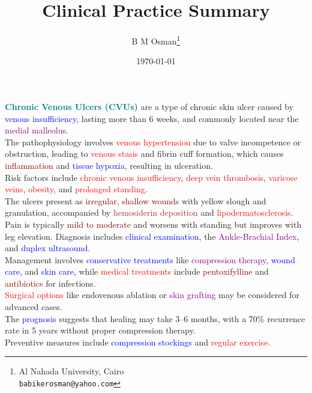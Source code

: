 \documentclass{article}
\title{Clinical Practice Summary}
\author{B M Osman\footnote{Al Nahada University, Cairo \\ \texttt{babikerosman@yahoo.com}}}
\date{\today}
\begin{document}
\maketitle

\textcolor{teal}{\Large \bf Chronic Venous Ulcers (CVUs)} are a type of chronic skin ulcer caused by \textcolor{blue}{venous insufficiency}, lasting more than 6 weeks, and commonly located near the \textcolor{purple}{medial malleolus}.\\
The pathophysiology involves \textcolor{red}{venous hypertension} due to valve incompetence or obstruction, leading to \textcolor{red}{venous stasis} and fibrin cuff formation, which causes \textcolor{darkred}{inflammation} and \textcolor{blue}{tissue hypoxia}, resulting in ulceration. \\
Risk factors include \textcolor{red}{chronic venous insufficiency}, \textcolor{red}{deep vein thrombosis}, \textcolor{red}{varicose veins}, \textcolor{red}{obesity}, and \textcolor{red}{prolonged standing}.\\
The ulcers present as \textcolor{darkred}{irregular, shallow wounds} with yellow slough and granulation, accompanied by \textcolor{brown}{hemosiderin deposition} and \textcolor{red}{lipodermatosclerosis}.\\
Pain is typically \textcolor{darkred}{mild to moderate} and worsens with standing but improves with leg elevation. Diagnosis includes \textcolor{blue}{clinical examination}, the \textcolor{purple}{Ankle-Brachial Index}, and \textcolor{blue}{duplex ultrasound}.\\
Management involves \textcolor{blue}{conservative treatments} like \textcolor{purple}{compression therapy}, \textcolor{blue}{wound care}, and \textcolor{blue}{skin care}, while \textcolor{red}{medical treatments} include \textcolor{darkred}{pentoxifylline} and \textcolor{darkred}{antibiotics} for infections.\\
\textcolor{red}{Surgical options} like endovenous ablation or \textcolor{purple}{skin grafting} may be considered for advanced cases.\\
The \textcolor{blue}{prognosis} suggests that healing may take 3–6 months, with a 70\% recurrence rate in 5 years without proper compression therapy.\\
Preventive measures include \textcolor{blue}{compression stockings} and \textcolor{red}{regular exercise}.

\bigskip
\newpage
\end{document}

